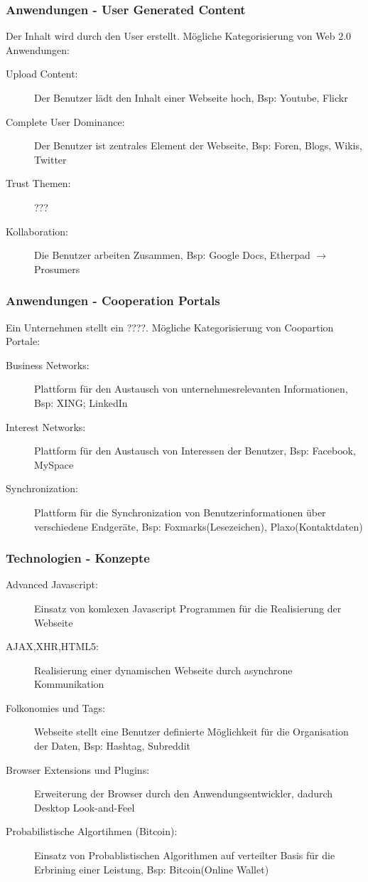 \documentclass{article} %
\begin{document}
	\subsubsection{Anwendungen - User Generated Content}
	Der Inhalt wird durch den User erstellt. Mögliche Kategorisierung von Web 2.0 Anwendungen:
		\begin{description}
			\item [Upload Content:] Der Benutzer lädt den Inhalt einer Webseite hoch, Bsp: Youtube, Flickr
			\item [Complete User Dominance:] Der Benutzer ist zentrales Element der Webseite, Bsp: Foren, Blogs, Wikis, Twitter
			\item [Trust Themen:] ???
			\item [Kollaboration:] Die Benutzer arbeiten Zusammen, Bsp: Google Docs, Etherpad $\rightarrow$ Prosumers
		\end{description}
	\subsubsection{Anwendungen - Cooperation Portals}
	Ein Unternehmen stellt ein ????. Mögliche Kategorisierung von Coopartion Portale:
		\begin{description}
			\item[Business Networks:] Plattform für den Austausch von unternehmesrelevanten Informationen, Bsp: XING; LinkedIn
			\item[Interest Networks:] Plattform für den Austausch von Interessen der Benutzer, Bsp: Facebook, MySpace
			\item[Synchronization:] Plattform für die Synchronization von Benutzerinformationen über verschiedene Endgeräte, Bsp: Foxmarks(Lesezeichen), Plaxo(Kontaktdaten)
		\end{description}
	\subsubsection{Technologien - Konzepte}
	\begin{description}
		\item[Advanced Javascript:] Einsatz von komlexen Javascript Programmen für die Realisierung der Webseite
		\item[AJAX,XHR,HTML5:]  Realisierung einer dynamischen Webseite durch asynchrone Kommunikation
		\item[Folkonomies und Tags:] Webseite stellt eine Benutzer definierte Möglichkeit für die Organisation der Daten, Bsp: Hashtag, Subreddit
		\item[Browser Extensions und Plugins:] Erweiterung der Browser durch den Anwendungsentwickler, dadurch Desktop Look-and-Feel
		\item[Probabilistische Algortihmen (Bitcoin):] Einsatz von Probablistischen Algorithmen auf verteilter Basis für die Erbrining einer Leistung, Bsp: Bitcoin(Online Wallet)
	\end{description}	
\end{document}
